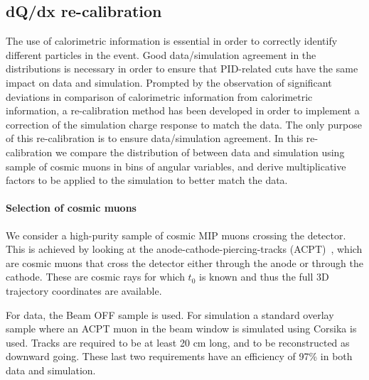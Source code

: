 \subsection{dQ/dx re-calibration}
\label{sec:recalibration}
The use of calorimetric information is essential in order to correctly identify different particles in the event.
Good data/simulation agreement in the \dedx distributions is necessary in order to ensure that PID-related cuts have the same impact on data and simulation.
Prompted by the observation of significant deviations in comparison of calorimetric information from calorimetric information, a re-calibration method has been developed in order to implement a correction of the simulation charge response to match the data. The only purpose of this re-calibration is to ensure data/simulation agreement.
In this re-calibration we compare the distribution of \dqdx between data and simulation using sample of cosmic muons in bins of angular variables, and derive multiplicative factors to be applied to the simulation to better match the data.

\paragraph{Selection of cosmic muons}
We consider a high-purity sample of cosmic MIP muons crossing the detector.
This is achieved by looking at the anode-cathode-piercing-tracks (ACPT)~\cite{bib:ACPT}, which are cosmic muons that cross the detector either through the anode or through the cathode.
These are cosmic rays for which $t_0$ is known and thus the full 3D trajectory coordinates are available.

For data, the Beam OFF sample is used. For simulation a standard overlay sample where an ACPT muon in the beam window is simulated using Corsika is used.
Tracks are required to be at least 20 cm long, and to be reconstructed as downward going. These last two requirements have an efficiency of 97\% in both data and simulation.

